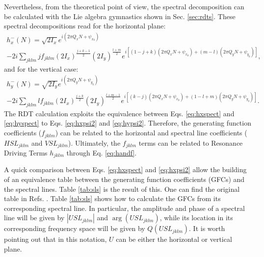 Nevertheless, from the theoretical point of view, the spectral decomposition can be calculated with the Lie algebra gymnastics shown in Sec. \ref{sec:rdts}. These spectral decompositions read for the horizontal plane:
\begin{multline}
    \label{eq:hxpsi2}
    h_x^{-}(N)=\sqrt{2I_x}e^{i\left( 2 \pi Q_x N+\psi_{x_0}\right)} \\
    -2i \sum_{jklm} j f_{jklm} \left( 2I_x \right)^{\frac{j+k-1}{2}}\left( 2I_y \right)^{\frac{l+m}{2}}
    e^{i \left[ \left( 1-j+k\right)\left( 2 \pi Q_x N + \psi_{x_0} \right) +\left( m-l\right)\left( 2 \pi Q_y N + \psi_{y_0} \right)\right]},
\end{multline}
and for the vertical case:
\begin{multline}
    \label{eq:hypsi2}
    h_y^{-}(N)=\sqrt{2I_y}e^{i\left( 2 \pi Q_y N+\psi_{y_0}\right)} \\
    -2i \sum_{jklm} l f_{jklm} \left( 2I_x \right)^{\frac{j+k}{2}}\left( 2I_y \right)^{\frac{l+m-1}{2}}
    e^{i \left[ \left( k-j\right)\left( 2 \pi Q_x N + \psi_{x_0} \right) +\left( 1-l+m\right)\left( 2 \pi Q_y N + \psi_{y_0} \right)\right]}.
\end{multline}
The RDT calculation exploits the equivalence between Eqs. \ref{eq:hxspect} and \ref{eq:hyspect} to Eqs. \ref{eq:hxpsi2} and \ref{eq:hypsi2}. Therefore, the generating function coefficients ($f_{jklm}$) can be related to the horizontal and spectral line coefficients ($HSL_{jklm}$ and $VSL_{jklm}$). Ultimately, the $f_{jklm}$ terms can be related to Resonance Driving Terms $h_{jklm}$ through Eq. \ref{eq:handf}.

A quick comparison between Eqs. \ref{eq:hxspect} and \ref{eq:hxpsi2} allow the building of an equivalence table between the generating function coefficients (GFCs) and the spectral lines. Table \ref{tab:sls} is the result of this. One can find the original table in Refs. \cite{sussix,bartolini}. Table \ref{tab:sls} shows how to calculate the GFCs from its corresponding spectral line. In particular, the amplitude and phase of a spectral line will be given by $|USL_{jklm}|$ and $\arg(USL_{jklm})$, while its location in its corresponding frequency space will be given by $Q(USL_{jklm})$. It is worth pointing out that in this notation, $U$ can be either the horizontal or vertical plane.

